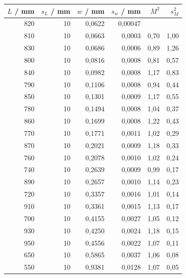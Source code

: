 \begin{table}
    \centering
    \begin{tabular}{rrrrrr}
        \toprule
        $L$ / mm &  $s_L$ / mm &    $w$ / mm &  $s_w$ / mm&     $M^2$ &        $s_M^2$ \\
        \midrule
        820 &  10 &  0,0622 &  0,00047 &       &       \\
        810 &  10 &  0,0663 &  0,0003 &  0,70 &  1,00 \\
        830 &  10 &  0,0686 &  0,0006 &  0,89 &  1,26 \\
        800 &  10 &  0,0816 &  0,0008 &  0,81 &  0,57 \\
        840 &  10 &  0,0982 &  0,0008 &  1,17 &  0,83 \\
        790 &  10 &  0,1106 &  0,0008 &  0,94 &  0,44 \\
        850 &  10 &  0,1301 &  0,0009 &  1,17 &  0,55 \\
        780 &  10 &  0,1494 &  0,0008 &  1,04 &  0,37 \\
        860 &  10 &  0,1699 &  0,0008 &  1,22 &  0,43 \\
        770 &  10 &  0,1771 &  0,0011 &  1,02 &  0,29 \\
        870 &  10 &  0,2021 &  0,0009 &  1,18 &  0,33 \\
        760 &  10 &  0,2078 &  0,0010 &  1,02 &  0,24 \\
        740 &  10 &  0,2639 &  0,0009 &  0,99 &  0,17 \\
        890 &  10 &  0,2657 &  0,0010 &  1,14 &  0,23 \\
        720 &  10 &  0,3357 &  0,0016 &  1,01 &  0,14 \\
        910 &  10 &  0,3361 &  0,0015 &  1,13 &  0,17 \\
        700 &  10 &  0,4155 &  0,0027 &  1,05 &  0,12 \\
        930 &  10 &  0,4250 &  0,0024 &  1,18 &  0,15 \\
        950 &  10 &  0,4556 &  0,0022 &  1,07 &  0,11 \\
        650 &  10 &  0,5865 &  0,0037 &  1,06 &  0,08 \\
        550 &  10 &  0,9381 &  0,0128 &  1,07 &  0,05 \\
        \bottomrule
    \end{tabular}
    \label{tab:M3}
\end{table}

